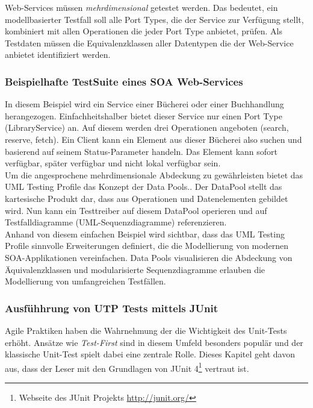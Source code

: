Web-Services müssen \textit{mehrdimensional} getestet werden\cite{_model-driven_2007}. Das bedeutet, ein modellbasierter Testfall soll alle Port Types, die der Service zur Verfügung stellt, kombiniert mit allen Operationen die jeder Port Type anbietet, prüfen. Als Testdaten müssen die Equivalenzklassen aller Datentypen die der Web-Service anbietet identifiziert werden.

\subsubsection{Beispielhafte TestSuite eines SOA Web-Services}
 In diesem Beispiel wird ein Service einer Bücherei oder einer Buchhandlung herangezogen. Einfachheitshalber bietet dieser Service nur einen Port Type (LibraryService) an. Auf diesem werden drei Operationen angeboten (search, reserve, fetch). Ein Client kann ein Element aus dieser Bücherei also suchen und basierend auf seinem Status-Parameter handeln. Das Element kann sofort verfügbar, später verfügbar und nicht lokal verfügbar sein.\\

Um die angesprochene mehrdimensionale Abdeckung zu gewährleisten bietet das UML Testing Profile das Konzept der Data Pools.. Der DataPool stellt das kartesische Produkt dar, dass aus Operationen und Datenelementen gebildet wird. Nun kann ein Testtreiber auf diesem DataPool operieren und auf Testfalldiagramme (UML-Sequenzdiagramme) referenzieren.\\
Anhand von diesem einfachen Beispiel wird sichtbar, dass das UML Testing Profile sinnvolle Erweiterungen definiert, die die Modellierung von modernen SOA-Applikationen vereinfachen. Data Pools visualisieren die Abdeckung von Äquivalenzklassen und modularisierte Sequenzdiagramme erlauben die Modellierung von umfangreichen Testfällen. 


\subsubsection{Ausfühhrung von UTP Tests mittels JUnit}
Agile Praktiken haben die Wahrnehmung der die Wichtigkeit des Unit-Tests erhöht\cite{_model-driven_2007}. Ansätze wie \textit{Test-First} sind in diesem Umfeld besonders populär und der klassische Unit-Test spielt dabei eine zentrale Rolle. Dieses Kapitel geht davon aus, dass der Leser mit den Grundlagen von JUnit 4\footnote{Webseite des JUnit Projekts \url{http://junit.org/}} vertraut ist.\\

